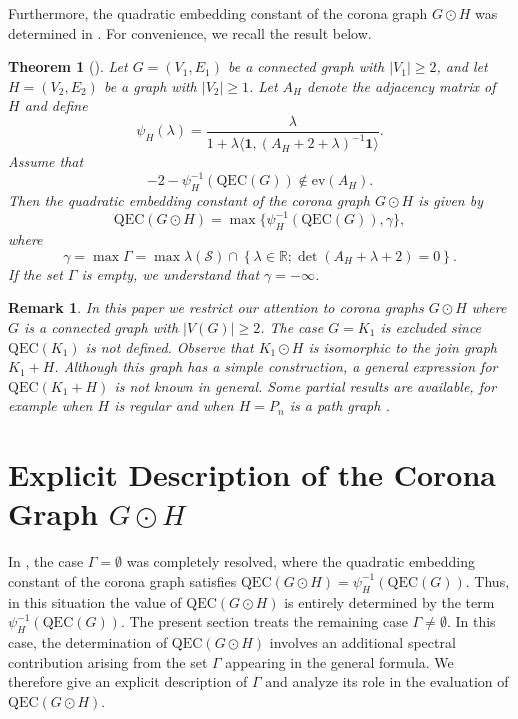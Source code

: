 \documentclass[pdflatex,sn-mathphys-num]{sn-jnl}
\theoremstyle{thmstyleone}%
\newtheorem{theorem}{Theorem}%
\theoremstyle{thmstyletwo}%
\newtheorem{remark}{Remark}%
\theoremstyle{thmstylethree}%
\begin{document}
Furthermore, the quadratic embedding constant of the corona graph $G\odot H$ was determined in \cite{Ferdi-Baskoro-Obata-Santika2025}. For convenience, we recall the result below.

\begin{theorem}[\cite{Ferdi-Baskoro-Obata-Santika2025}]\label{thm:corona-general}
Let $G=(V_1,E_1)$ be a connected graph with $|V_1|\ge 2$, 
and let $H=(V_2,E_2)$ be a graph with $|V_2|\ge 1$. 
Let $A_H$ denote the adjacency matrix of $H$ and define
\[
\psi_H(\lambda)
=
\frac{\lambda}{
1+\lambda \langle \mathbf{1}, (A_H+2+\lambda)^{-1}\mathbf{1}\rangle}.
\]
Assume that
\begin{equation}\label{eq:condition-spectrum}
-2-\psi_{H}^{-1}(\mathrm{QEC}(G))
\notin \mathrm{ev}(A_H).
\end{equation}
Then the quadratic embedding constant of the corona graph $G\odot H$ is given by
\begin{equation}\label{eq:qec-corona}
\mathrm{QEC}(G\odot H)
=
\max\{
\psi_{H}^{-1}(\mathrm{QEC}(G)),
\gamma
\},
\end{equation}
where
\begin{equation}\label{eq:gamma3}
\gamma
=\max\Gamma=
\max \lambda(\mathcal{S})\cap\left\{
\lambda \in \mathbb{R};
\det(A_H+\lambda+2)=0
\right\}.
\end{equation}
If the set $\Gamma$ is empty, we understand that $\gamma=-\infty$.
\end{theorem}

\begin{remark}
In this paper we restrict our attention to corona graphs $G \odot H$ where $G$ is a connected graph with $|V(G)| \ge 2$. 
The case $G=K_1$ is excluded since $\mathrm{QEC}(K_1)$ is not defined. 
Observe that $K_1 \odot H$ is isomorphic to the join graph $K_1+H$. 
Although this graph has a simple construction, a general expression for 
$\mathrm{QEC}(K_1+H)$ is not known in general. Some partial results are available, for example when $H$ is regular 
\cite{Lou-Obata-Huang2022} and when $H=P_n$ is a path graph 
\cite{Mlotkowski-Obata2025a,Mlotkowski-Obata2025b}.
\end{remark}

\section{Explicit Description of the Corona Graph $G\odot H$}

In \cite{Ferdi-Baskoro-Obata-Santika2025}, the case $\Gamma=\emptyset$ was completely resolved, where the quadratic embedding constant of the corona graph satisfies $\mathrm{QEC}(G\odot H)=\psi_H^{-1}(\mathrm{QEC}(G))$. Thus, in this situation the value of $\mathrm{QEC}(G\odot H)$ is entirely determined by the term $\psi_H^{-1}(\mathrm{QEC}(G))$. The present section treats the remaining case $\Gamma\ne\emptyset$. In this case, the determination of $\mathrm{QEC}(G\odot H)$ involves an additional spectral contribution arising from the set $\Gamma$ appearing in the general formula. We therefore give an explicit description of $\Gamma$ and analyze its role in the evaluation of $\mathrm{QEC}(G\odot H)$.
\end{document}
